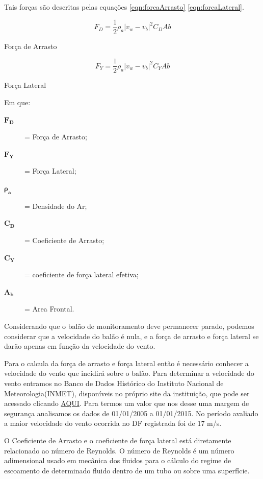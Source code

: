 Tais forças são descritas pelas equações \eqref{eqn:forcaArrasto} \eqref{eqn:forcaLateral}.

	\begin{Equacao}[H]
		\begin{equation}
			F_{D} = \frac{1}{2} \rho_{a} \left | v_{w} - v_{b} \right |^{2} C_{D}A{b}
		\end{equation}
		\caption[Força de arrasto]{Força de Arrasto~\cite{yajima}}
		\label{eqn:forcaArrasto}
	\end{Equacao}

	\begin{Equacao}[H]
		\begin{equation}
			F_{Y} = \frac{1}{2} \rho_{a} \left | v_{w} - v_{b} \right |^{2} C_{Y}A{b}
		\end{equation}
		\caption[Força lateral]{Força Lateral~\cite{yajima}}
		\label{eqn:forcaLateral}
	\end{Equacao}

	Em que:
	\begin{description}
		\item[$\boldsymbol{F_{D}}$] = Força de Arrasto;
		\item[$\boldsymbol{F_{Y}}$] = Força Lateral;
		\item[$\boldsymbol{\rho_{a}}$] = Densidade do Ar;
		\item[$\boldsymbol{C_{D}}$] = Coeficiente de Arrasto;
		\item[$\boldsymbol{C_{Y}}$] = coeficiente de força lateral efetiva;
		\item[$\boldsymbol{A_{b}}$] = Area Frontal.
	\end{description}

	Considerando que o balão de monitoramento deve permanecer parado, podemos considerar que a velocidade do balão é nula, e a força de arrasto e força lateral se darão apenas em função da velocidade do vento.

	Para o calcula da força de arrasto e força lateral então é necessário conhecer a velocidade do vento que incidirá sobre o balão. Para determinar a velocidade do vento entramos no Banco de Dados Histórico do Instituto Nacional de Meteorologia(INMET), disponíveis no próprio site da instituição, que pode ser acessado clicando \href{www.inmet.gov.br}{AQUI}. Para termos um valor que nos desse uma margem de segurança analisamos os dados de 01/01/2005 a 01/01/2015. No período avaliado a maior velocidade do vento ocorrida no DF registrada foi de 17 m/s.

	O Coeficiente de Arrasto e o coeficiente de força lateral está diretamente relacionado ao número de Reynolds. O número de Reynolds é um número adimensional usado em mecânica dos fluidos para o cálculo do regime de escoamento de determinado fluido dentro de um tubo ou sobre uma superfície.~\cite{bird}

